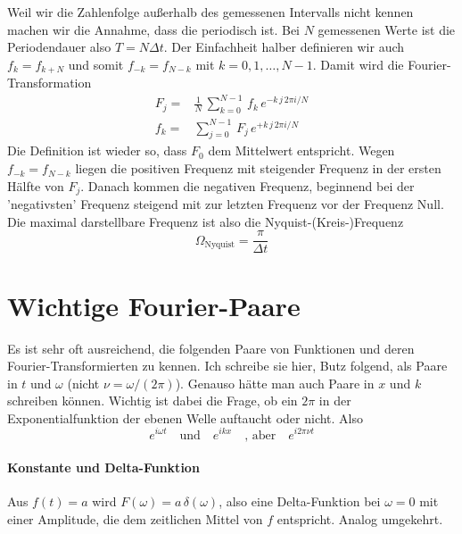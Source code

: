 Weil wir die Zahlenfolge außerhalb des gemessenen Intervalls nicht kennen machen wir die Annahme, dass die periodisch ist. Bei $N$ gemessenen Werte ist die Periodendauer also $T = N \Delta t$. Der Einfachheit halber definieren wir auch $f_k = f_{k + N}$ und somit $f_{-k} = f_{N - k}$ mit $k= 0, 1, \dots, N-1$. Damit wird die Fourier-Transformation
\begin{align}
 F_j = & \frac{1}{N} \, \sum_{k=0}^{N-1} \, f_k \, e^{- k \, j \, 2 \pi i / N } \\
  f_k = &  \sum_{j=0}^{N-1} \, F_j \, e^{+ k \,  j \, 2 \pi i / N } 
\end{align}
Die Definition ist wieder so, dass $F_0$ dem Mittelwert entspricht. Wegen $f_{-k} = f_{N - k}$ liegen die positiven Frequenz mit steigender Frequenz in der ersten Hälfte von $F_j$. Danach kommen die negativen Frequenz, beginnend bei der 'negativsten' Frequenz steigend mit zur letzten Frequenz vor der Frequenz Null. Die maximal darstellbare Frequenz ist also die Nyquist-(Kreis-)Frequenz
\begin{equation}
\Omega_\text{Nyquist} = \frac{\pi}{\Delta t}
\end{equation}


\section{Wichtige Fourier-Paare}

Es ist sehr oft ausreichend, die folgenden Paare von Funktionen und deren Fourier-Transformierten zu kennen. Ich schreibe sie hier, Butz folgend, als Paare in $t$ und $\omega$ (nicht $\nu = \omega / (2 \pi)$). Genauso hätte man auch Paare in $x$ und $k$ schreiben können. Wichtig ist dabei die Frage, ob ein $2 \pi$ in der Exponentialfunktion der ebenen Welle auftaucht oder nicht. Also
\begin{equation}
e^{i \omega t} \quad \text{und} \quad e^{i k x} \quad \text{, aber} \quad 
e^{i 2 \pi \nu t}
\end{equation}

\paragraph{Konstante und Delta-Funktion} Aus $f(t) = a$ wird $F(\omega) = a \, \delta(\omega)$, also eine Delta-Funktion bei $\omega = 0$ mit einer Amplitude, die dem zeitlichen Mittel von $f$ entspricht. Analog umgekehrt.

